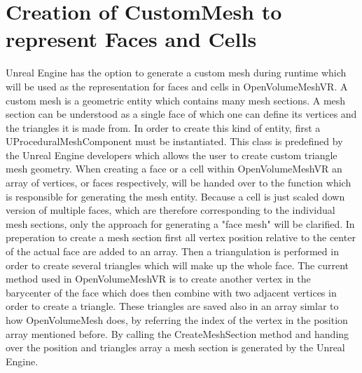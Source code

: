 \documentclass{report}
\begin{document}
	\section{Creation of CustomMesh to represent Faces and Cells} \label{CustomMesh}
	\startsection
		Unreal Engine has the option to generate a custom mesh during runtime which will be used as the representation for faces and cells in OpenVolumeMeshVR. A custom mesh is a geometric entity which contains many mesh sections. A mesh section can be understood as a single face of which one can define its vertices and the triangles it is made from. In order to create this kind of entity, first a UProceduralMeshComponent must be instantiated. This class is predefined by the Unreal Engine developers which allows the user to create custom triangle mesh geometry. When creating a face or a cell within OpenVolumeMeshVR an array of vertices, or faces respectively, will be handed over to the function which is responsible for generating the mesh entity. Because a cell is just scaled down version of multiple faces, which are therefore corresponding to the individual mesh sections, only the approach for generating a "face mesh" will be clarified. In preperation to create a mesh section first all vertex position relative to the center of the actual face are added to an array. Then a triangulation is performed in order to create several triangles which will make up the whole face. The current method used in OpenVolumeMeshVR is to create another vertex in the barycenter of the face which does then combine with two adjacent vertices in order to create a triangle. These triangles are saved also in an array simlar to how OpenVolumeMesh does, by referring the index of the vertex in the position array mentioned before. By calling the CreateMeshSection method and handing over the position and triangles array a mesh section is generated by the Unreal Engine.
	\closesection
	
\end{document}
